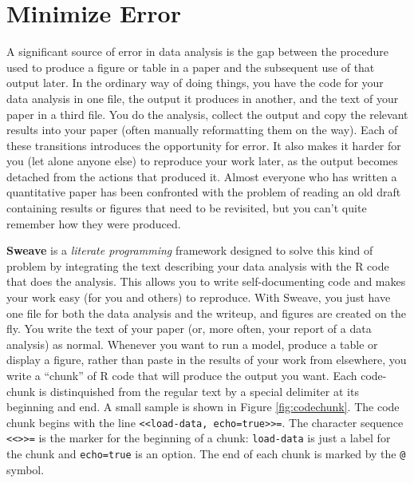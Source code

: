\documentclass[11pt,article]{memoir}
\begin{document}
\section{Minimize Error}  
A significant source of error in data analysis is the gap between the procedure used to produce a figure or table in a paper and the subsequent use of that output later. In the ordinary way of doing things, you have the code for your data analysis in one file, the output it produces in another, and the text of your paper in a third file. You do the analysis, collect the output and copy the relevant results into your paper (often manually reformatting them on the way). Each of these transitions introduces the opportunity for error. It also makes it harder for you (let alone anyone else) to reproduce your work later, as the output becomes detached from the actions that produced it. Almost everyone who has written a quantitative paper has been confronted with the problem of reading an old draft containing results or figures that need to be revisited, but you can't quite remember how they were produced. 

\smallskip

\textbf{Sweave} is a \emph{literate programming} framework designed to solve this kind of problem by integrating the text describing your data analysis with the R code that does the analysis. This allows you to write self-documenting code and makes your work easy (for you and others) to reproduce. With Sweave, you just have one file for both the data analysis and the writeup, and figures are created on the fly. You write the text of your paper (or, more often, your report of a data analysis) as normal. Whenever you want to run a model, produce a table or display a figure, rather than paste in the results of your work from elsewhere, you write a ``chunk'' of R code that will produce the output you want. Each code-chunk is distinquished from the regular text by a special delimiter at its beginning and end. A small sample is shown in Figure \ref{fig:codechunk}. The code chunk begins with the line \lstinline!<<load-data, echo=true>>=!. The character sequence \lstinline!<<>>=! is the marker for the beginning of a chunk: \lstinline!load-data! is just a label for the chunk and \lstinline!echo=true! is an option. The end of each chunk is marked by the \lstinline!@! symbol.
\end{document}
